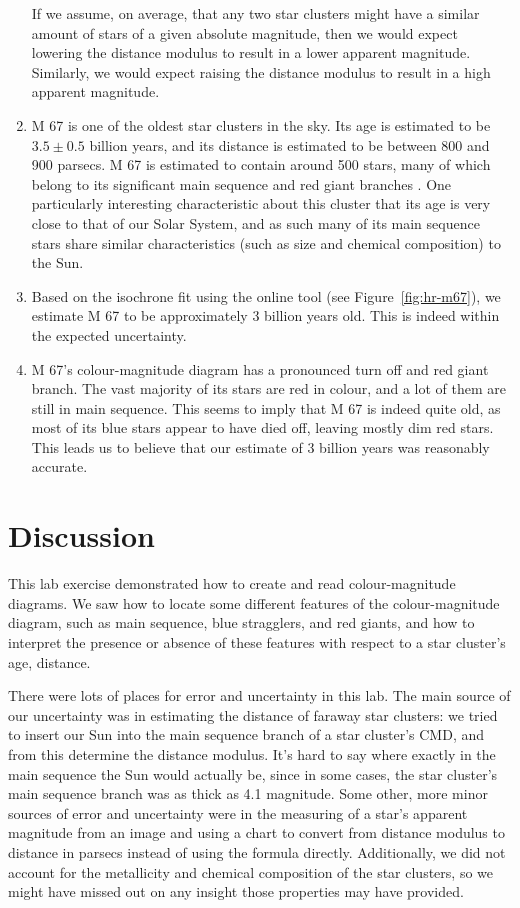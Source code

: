 \documentclass[11pt]{article}
\begin{document}
\begin{enumerate}[label={\textbf{\emph{(\arabic*)}}}]
If we assume, on average, that any two star clusters might have a similar amount of stars of a given absolute magnitude, then we would expect lowering the distance modulus to result in a lower apparent magnitude.
Similarly, we would expect raising the distance modulus to result in a high apparent magnitude.
	\item %
M 67 is one of the oldest star clusters in the sky.
Its age is estimated to be $3.5 \pm 0.5$ billion years, and its distance is estimated to be between 800 and 900 parsecs.
M 67 is estimated to contain around 500 stars, many of which belong to its significant main sequence and red giant branches \cite{seds-m67}.
One particularly interesting characteristic about this cluster that its age is very close to that of our Solar System, and as such many of its main sequence stars share similar characteristics (such as size and chemical composition) to the Sun.
	\item %
Based on the isochrone fit using the online tool (see Figure~\ref{fig:hr-m67}), we estimate M 67 to be approximately 3 billion years old.
This is indeed within the expected uncertainty.
	\item %
M 67's colour-magnitude diagram has a pronounced turn off and red giant branch.
The vast majority of its stars are red in colour, and a lot of them are still in main sequence.
This seems to imply that M 67 is indeed quite old, as most of its blue stars appear to have died off, leaving mostly dim red stars.
This leads us to believe that our estimate of 3 billion years was reasonably accurate.
\end{enumerate}


\section{Discussion}
This lab exercise demonstrated how to create and read colour-magnitude diagrams.
We saw how to locate some different features of the colour-magnitude diagram, such as main sequence, blue stragglers, and red giants, and how to interpret the presence or absence of these features with respect to a star cluster's age, distance.

There were lots of places for error and uncertainty in this lab.
The main source of our uncertainty was in estimating the distance of faraway star clusters: we tried to insert our Sun into the main sequence branch of a star cluster's CMD, and from this determine the distance modulus.
It's hard to say where exactly in the main sequence the Sun would actually be, since in some cases, the star cluster's main sequence branch was as thick as 4.1 magnitude.
Some other, more minor sources of error and uncertainty were in the measuring of a star's apparent magnitude from an image and using a chart to convert from distance modulus to distance in parsecs instead of using the formula directly.
Additionally, we did not account for the metallicity and chemical composition of the star clusters, so we might have missed out on any insight those properties may have provided.
\end{document}

